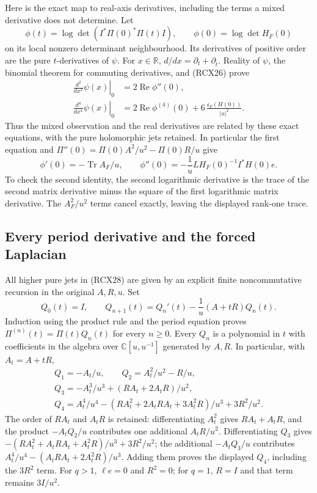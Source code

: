 \documentclass{article}
\begin{document}
Here is the exact map to real-axis derivatives, including the
terms a mixed derivative does not determine. Let
\[
 \phi(t)=\log\det\!\left(I^*\Pi(0)^*\Pi(t)I\right),
 \qquad \phi(0)=\log\det H_F(0)
 \tag{RCX27}
\]
on its local nonzero determinant neighbourhood. Its derivatives
of positive order are the pure \(t\)-derivatives of \(\psi\).
For \(x\in\mathbb R\), \(d/dx=\partial_t+\partial_{\bar t}\).
Reality of \(\psi\), the binomial theorem for commuting derivatives,
and (RCX26) prove
\[
\begin{split}
 \left.\frac{d^2}{dx^2}\psi(x)\right|_0
   &=2\operatorname{Re}\phi''(0),\\
 \left.\frac{d^4}{dx^4}\psi(x)\right|_0
   &=2\operatorname{Re}\phi^{(4)}(0)
       +6\,\frac{\mathfrak c_F(H(0))}{|u|^2}.
\end{split}\tag{RCX28}
\]
Thus the mixed observation and the real derivatives are related
by these exact equations, with the pure holomorphic jets retained.
In particular the first equation and
\(\Pi''(0)=\Pi(0)A^2/u^2-\Pi(0)R/u\) give
\[
 \phi'(0)=-\operatorname{Tr}A_F/u,\qquad
 \phi''(0)=-\frac1u L H_F(0)^{-1}I^*H(0)e .
 \tag{RCX29}
\]
To check the second identity, the second logarithmic derivative
is the trace of the second matrix derivative minus the square
of the first logarithmic matrix derivative. The \(A_F^2/u^2\)
terms cancel exactly, leaving the displayed rank-one trace.

\subsection{Every period derivative and the forced Laplacian}

All higher pure jets in (RCX28) are given by an explicit finite
noncommutative recursion in the original \(A,R,u\). Set
\[
 Q_0(t)=I,\qquad
 Q_{n+1}(t)=Q_n'(t)-\frac1u(A+tR)Q_n(t).
 \tag{RCX30}
\]
Induction using the product rule and the period equation proves
\(\Pi^{(n)}(t)=\Pi(t)Q_n(t)\) for every \(n\ge0\).
Every \(Q_n\) is a polynomial in \(t\) with coefficients in the
algebra over \(\mathbb C[u,u^{-1}]\) generated by \(A,R\).
In particular, with \(A_t=A+tR\),
\[
 \begin{gathered}
 Q_1=-A_t/u,\qquad Q_2=A_t^2/u^2-R/u,\\
 Q_3=-A_t^3/u^3+(RA_t+2A_tR)/u^2,\\
 Q_4=A_t^4/u^4
       -(RA_t^2+2A_tRA_t+3A_t^2R)/u^3+3R^2/u^2 .
 \end{gathered}
 \tag{RCX31}
\]
The order of \(RA_t\) and \(A_tR\) is retained: differentiating
\(A_t^2\) gives \(RA_t+A_tR\), and the product
\(-A_tQ_2/u\) contributes one additional \(A_tR/u^2\).
Differentiating \(Q_3\) gives
\(-(RA_t^2+A_tRA_t+A_t^2R)/u^3+3R^2/u^2\);
the additional \(-A_tQ_3/u\) contributes
\(A_t^4/u^4-(A_tRA_t+2A_t^2R)/u^3\).
Adding them proves the displayed \(Q_4\), including the \(3R^2\)
term. For \(q>1\), \(\ell e=0\) and \(R^2=0\); for \(q=1\),
\(R=I\) and that term remains \(3I/u^2\).
\end{document}
